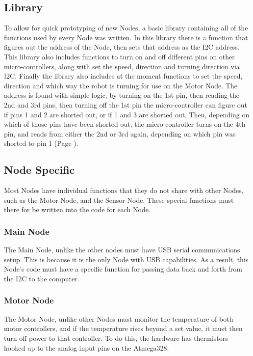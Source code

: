 \documentclass{article}
\begin{document}
\subsection{Library}
To allow for quick prototyping of new Nodes, a basic library containing all of the functions used by every Node was written. In this library there is a function that figures out the address of the Node, then sets that address as the I2C address. This library also includes functions to turn on and off different pins on other micro-controllers, along with set the speed, direction and turning direction via I2C. Finally the library also includes at the moment functions to set the speed, direction and which way the robot is turning for use on the Motor Node.
The address is found with simple logic, by turning on the 1st pin, then reading the 2nd and 3rd pins, then turning off the 1st pin the micro-controller can figure out if pins 1 and 2 are shorted out, or if 1 and 3 are shorted out. Then, depending on which of those pins have been shorted out, the micro-controller turns on the 4th pin, and reads from either the 2nd or 3rd again, depending on which pin was shorted to pin 1 (Page \pageref{address}).\\
\subsection{Node Specific}
Most Nodes have individual functions that they do not share with other Nodes, such as the Motor Node, and the Sensor Node. These special functions must there for be written into the code for each Node.\\
\subsubsection{Main Node}
The Main Node, unlike the other nodes must have USB serial communications setup. This is because it is the only Node with USB capabilities. As a result, this Node's code must have a specific function for passing data back and forth from the I2C to the computer.\\
\subsubsection{Motor Node}
The Motor Node, unlike other Nodes must monitor the temperature of both motor controllers, and if the temperature rises beyond a set value, it must then turn off power to that controller. To do this, the hardware has thermistors hooked up to the analog input pins on the Atmega328.\\
\end{document}
